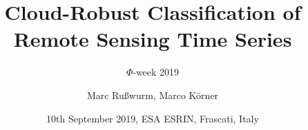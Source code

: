 \documentclass[%
  aspectratio=169,
  9pt,
  USenglish,
  light,
  mathserif,
  professionalfont,
  affiliationintitlepagehead,
  titlegraphic,
   affiliation,
]{beamer}
\title{Cloud-Robust Classification of Remote Sensing Time Series}
\subtitle{$\Phi$-week 2019}
\author[M. Rußwurm, M. Körner]{Marc Rußwurm, Marco Körner}
\institute[TUM]{%
	\vspace{5em}
}
\date{10th September 2019, ESA ESRIN, Frascati, Italy}
\begin{document}
\begin{frame}[t]
  \titlepage
\end{frame}

%	
%
%

	
\end{document}
